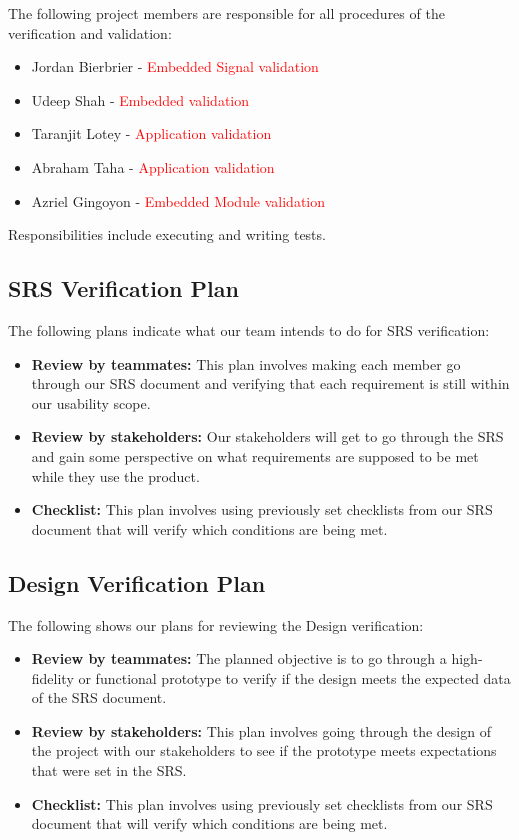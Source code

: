 \documentclass[12pt, titlepage]{article}
\begin{document}
The following project members are responsible for all procedures of the verification and validation:
\begin{itemize}
    \item Jordan Bierbrier  - \textcolor{red}{Embedded Signal validation}
    \item Udeep Shah - \textcolor{red}{Embedded validation}
    \item Taranjit Lotey - \textcolor{red}{Application validation}
    \item Abraham Taha - \textcolor{red}{Application validation}
    \item Azriel Gingoyon - \textcolor{red}{Embedded Module validation}
\end{itemize}

\noindent Responsibilities include executing and writing tests.

\subsection{SRS Verification Plan}

The following plans indicate what our team intends to do for SRS verification:
\begin{itemize}
    \item \textbf{Review by teammates:} This plan involves making each member go through our SRS document and verifying that each requirement is still within our usability scope.
    \item \textbf{Review by stakeholders:} Our stakeholders will get to go through the SRS and gain some perspective on what requirements are supposed to be met while they use the product.
    \item \textbf{Checklist:} This plan involves using previously set checklists from our SRS document that will verify which conditions are being met.
\end{itemize}

\subsection{Design Verification Plan}

The following shows our plans for reviewing the Design verification:
\begin{itemize}
    \item \textbf{Review by teammates:} The planned objective is to go through a high-fidelity or functional prototype to verify if the design meets the expected data of the SRS document.
    \item \textbf{Review by stakeholders:} This plan involves going through the design of the project with our stakeholders to see if the prototype meets expectations that were set in the SRS.
    \item \textbf{Checklist:} This plan involves using previously set checklists from our SRS document that will verify which conditions are being met.
\end{itemize}
\end{document}
